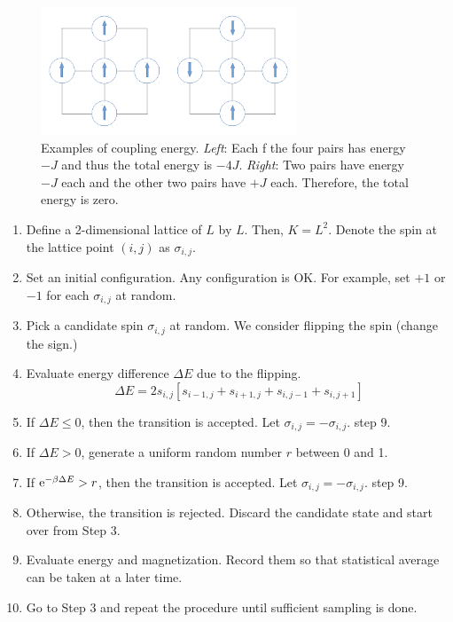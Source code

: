 \begin{figure}
\centering
\includegraphics[width=3in]{17.Metropolis/ising1.pdf}
\caption{Examples of coupling energy.  \textit{Left}: Each f the four pairs has energy $-J$ and thus the total energy is $-4J$.  \textit{Right}:  Two pairs have energy $-J$ each and the other two pairs have $+J$ each.  Therefore, the total energy is zero.}
\label{fig:ising_model1}
\end{figure}

\bigskip
\begin{myalgobox}
\label{algo:ising}

\medskip
\begin{minipage}{5.5in}
\small
\begin{enumerate}
\item Define a 2-dimensional lattice of $L$ by $L$.  Then, $K=L^2$.  Denote the spin at the lattice point $(i,j)$ as $\sigma_{i,j}$.
\item Set an initial configuration. Any configuration is OK. For example, set $+1$ or $-1$ for each $\sigma_{i,j}$ at random.
\item Pick a candidate spin $\sigma_{i,j}$ at random. We consider flipping the spin (change the sign.)
\item Evaluate energy difference $\Delta E$ due to the flipping.
\begin{equation}
\Delta E = 2 s_{i,j} [s_{i-1,j}+s_{i+1,j}+s_{i,j-1}+s_{i,j+1}]
\end{equation}
\item If $\Delta E \le 0$, then the transition is accepted. Let $\sigma_{i,j}=-\sigma_{i,j}$. step 9.
\item If $\Delta E > 0$, generate a uniform random number $r$  between 0 and 1.
\item If $\text{e}^{-\beta \Delta E} > r$, then the transition is accepted.  Let $\sigma_{i,j}=-\sigma_{i,j}$. step 9.
\item Otherwise, the transition is rejected.  Discard the candidate state and start over from Step 3.
\item Evaluate energy and magnetization.  Record them so that statistical average can be taken at a later time.
\item Go to Step 3 and repeat the procedure until sufficient sampling is done.
\end{enumerate}
\end{minipage}
\end{myalgobox}


